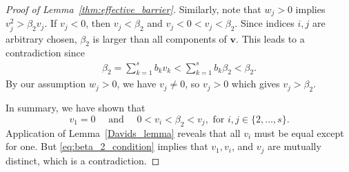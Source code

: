 \begin{proof}[Proof of Lemma~\ref{thm:effective_barrier}]
    	Similarly, note that $w_j > 0$ implies $v_j^2 > \beta_2 v_j$. 
    	If $v_j < 0$, then $v_j < \beta_2$ and $v_j < 0 < v_j < \beta_2$. 
    	Since indices $i, j$ are arbitrary chosen, $\beta_2$ is larger than all 
    	components of $\bm{v}$. 
    	This leads to a contradiction since
    	\begin{align*}
    		\beta_2 = \sum_{k=1}^s b_k v_k < \sum_{k=1}^s b_k\beta_2 < \beta_2.
    	\end{align*}
    	By our assumption $w_j>0$, we have $v_j \neq 0$, so $v_j > 0$ which gives $v_j > \beta_2$.
    	
    	In summary, we have shown that
    	\begin{equation}\label{eq:beta_2_condition}
    		v_1 = 0 \quad \text{ and } \quad 0 < v_i < \beta_2 < v_j, \text{ for } i, j \in \{2, \dots, s\}.
    \end{equation}
    Application of Lemma~\ref{Davids_lemma} reveals that all $v_i$ must
    be equal except for one.
    But \eqref{eq:beta_2_condition} implies that $v_1, v_i$, and $v_j$ are
    mutually distinct, which is a contradiction.
\end{proof}
